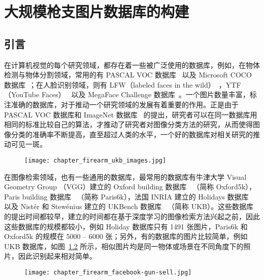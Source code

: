 
\chapter{大规模枪支图片数据库的构建}\label{chapter:firearm_dataset}
\section{引言}
在计算机视觉的每个研究领域，都存在着一些被广泛使用的数据库，例如，在物体检测与物体分割领域，常用的有 PASCAL VOC 数据库~\cite{Everingham2014ThePV} 以及 Microsoft COCO 数据库~\cite{Lin2014MicrosoftCC}；在人脸识别领域，则有 LFW（labeled faces in the wild）~\cite{LFWTech}，YTF（YouTube Faces）~\cite{Wolf2011FaceRI} 以及 MegaFace Challenge 数据库~\cite{kemelmacher2016megaface}。一个图片数量丰富，标注准确的数据库，对于推动一个研究领域的发展有着重要的作用。正是由于 PASCAL VOC 数据库和 ImageNet 数据库~\cite{Russakovsky2015ImageNetLS} 的提出，研究者可以在同一数据库用相同的标准比较自己的算法，才推动了研究者对图像分类方法的研究，从而使得图像分类的准确率不断提高，直至超过人类的水平，一个好的数据库对相关研究的推动可见一斑。

\begin{figure}[h]
	\centering
	\texttt{[image: chapter\_firearm\_ukb\_images.jpg]}
	\label{fig:gun_sell_group}
\end{figure}

在图像检索领域，也有一些通用的数据库，最常用的数据库有牛津大学 Visual Geometry Group （VGG）建立的 Oxford building 数据库~\cite{Philbin2007ObjectRW} （简称 Oxford5k），Paris building 数据库~\cite{Philbin2008LostIQ} （简称 Paris6k），法国 INRIA 建立的 Holidays 数据库~\cite{Jgou2008HammingEA} 以及 Nist{\'e}r 和 Stew{\'e}nius 建立的 UKBench 数据库~\cite{Nistr2006ScalableRW} （简称 UKB）。这些数据库的提出时间都较早，建立的时间都在基于深度学习的图像检索方法兴起之前，因此这些数据库的规模都较小，例如 Holiday 数据库只有 1491 张图片，Paris6k 和 Oxford5k 的规模在 5000 -- 6000 张；另外，有的数据库的图片比较简单，例如 UKB 数据库，如图~\ref{fig:ukb_images} 所示，相似图片均是同一物体或场景在不同角度下的照片，因此识别起来相对简单。

\begin{figure}[!t]
	\centering
	\texttt{[image: chapter\_firearm\_facebook-gun-sell.jpg]}
	\label{fig:ukb_images}
\end{figure}

